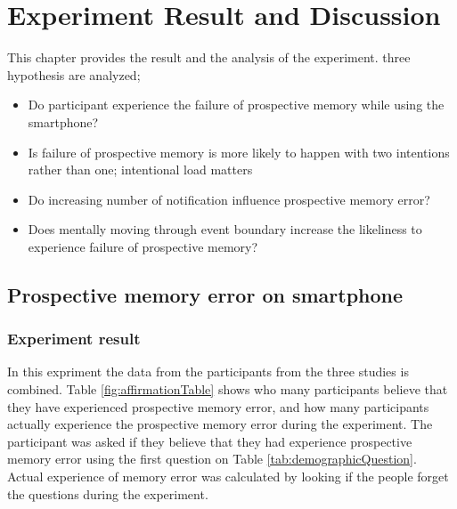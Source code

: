 \chapter{Experiment Result and Discussion}

This chapter provides the result and the analysis of the experiment. three hypothesis are analyzed;
\begin{itemize}
  \item{Do participant experience the failure of prospective memory while using the smartphone?}
  \item{Is failure of prospective memory is more likely to happen with two intentions rather than one; intentional load matters}
  \item{Do increasing number of notification influence prospective memory error?}
  \item{Does mentally moving through event boundary increase the likeliness to experience failure of prospective memory?}
\end{itemize}

\section{Prospective memory error on smartphone}

\subsection{Experiment result}
In this expriment the data from the participants from the three studies is combined.
Table \ref{fig:affirmationTable} shows who many participants believe that they have experienced prospective memory error,
and how many participants actually experience the prospective memory error during the experiment.
The participant was asked if they believe that they had experience prospective memory error using the first question on Table \ref{tab:demographicQuestion}.
Actual experience of memory error was calculated by looking if the people forget the questions during the experiment.


